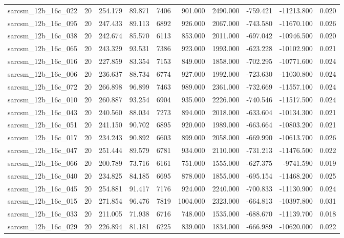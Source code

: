 \begin{tabular}{lrrrrrrrrr}
sarcsm\_12b\_16c\_022 & 20 & 254.179 & 89.871 & 7406 & 901.000 & 2490.000 & -759.421 & -11213.800 & 0.020 \\
sarcsm\_12b\_16c\_095 & 20 & 247.433 & 89.113 & 6892 & 926.000 & 2067.000 & -743.580 & -11670.100 & 0.026 \\
sarcsm\_12b\_16c\_038 & 20 & 242.674 & 85.570 & 6113 & 853.000 & 2011.000 & -697.042 & -10946.500 & 0.020 \\
sarcsm\_12b\_16c\_065 & 20 & 243.329 & 93.531 & 7386 & 923.000 & 1993.000 & -623.228 & -10102.900 & 0.021 \\
sarcsm\_12b\_16c\_016 & 20 & 227.859 & 83.354 & 7153 & 849.000 & 1858.000 & -702.295 & -10771.600 & 0.024 \\
sarcsm\_12b\_16c\_006 & 20 & 236.637 & 88.734 & 6774 & 927.000 & 1992.000 & -723.630 & -11030.800 & 0.024 \\
sarcsm\_12b\_16c\_072 & 20 & 266.898 & 96.899 & 7463 & 989.000 & 2361.000 & -732.669 & -11557.100 & 0.024 \\
sarcsm\_12b\_16c\_010 & 20 & 260.887 & 93.254 & 6904 & 935.000 & 2226.000 & -740.546 & -11517.500 & 0.024 \\
sarcsm\_12b\_16c\_043 & 20 & 240.560 & 88.034 & 7273 & 894.000 & 2018.000 & -633.604 & -10134.300 & 0.021 \\
sarcsm\_12b\_16c\_051 & 20 & 241.150 & 90.702 & 6895 & 920.000 & 1989.000 & -663.664 & -10803.200 & 0.021 \\
sarcsm\_12b\_16c\_017 & 20 & 234.243 & 90.892 & 6603 & 899.000 & 2058.000 & -669.990 & -10613.700 & 0.026 \\
sarcsm\_12b\_16c\_047 & 20 & 251.444 & 89.579 & 6781 & 934.000 & 2110.000 & -731.213 & -11476.500 & 0.022 \\
sarcsm\_12b\_16c\_066 & 20 & 200.789 & 73.716 & 6161 & 751.000 & 1555.000 & -627.375 & -9741.590 & 0.019 \\
sarcsm\_12b\_16c\_040 & 20 & 234.825 & 84.185 & 6695 & 878.000 & 1855.000 & -695.154 & -11468.200 & 0.025 \\
sarcsm\_12b\_16c\_045 & 20 & 254.881 & 91.417 & 7176 & 924.000 & 2240.000 & -700.833 & -11130.900 & 0.024 \\
sarcsm\_12b\_16c\_015 & 20 & 271.854 & 96.476 & 7819 & 1004.000 & 2323.000 & -664.813 & -10397.800 & 0.031 \\
sarcsm\_12b\_16c\_033 & 20 & 211.005 & 71.938 & 6716 & 748.000 & 1535.000 & -688.670 & -11139.700 & 0.018 \\
sarcsm\_12b\_16c\_029 & 20 & 226.894 & 81.181 & 6225 & 839.000 & 1834.000 & -666.989 & -10620.000 & 0.022 \\

\end{tabular}
